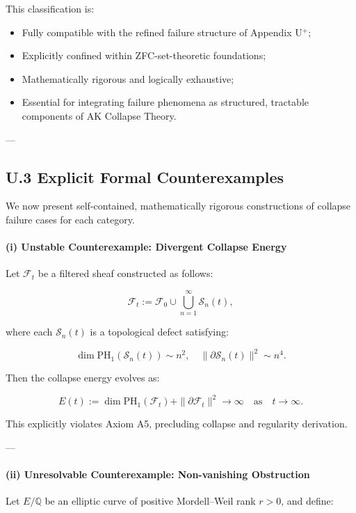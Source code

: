 \documentclass[11pt]{article}
\begin{document}
This classification is:

\begin{itemize}
    \item Fully compatible with the refined failure structure of Appendix U$^{+}$;
    \item Explicitly confined within ZFC-set-theoretic foundations;
    \item Mathematically rigorous and logically exhaustive;
    \item Essential for integrating failure phenomena as structured, tractable components of AK Collapse Theory.
\end{itemize}

---

\subsection*{U.3 Explicit Formal Counterexamples}

We now present self-contained, mathematically rigorous constructions of collapse failure cases for each category.

\paragraph{(i) Unstable Counterexample: Divergent Collapse Energy}

Let $\mathcal{F}_t$ be a filtered sheaf constructed as follows:

\[
\mathcal{F}_t := \mathcal{F}_0 \cup \bigcup_{n=1}^\infty \mathcal{S}_n(t),
\]

where each $\mathcal{S}_n(t)$ is a topological defect satisfying:

\[
\dim \mathrm{PH}_1(\mathcal{S}_n(t)) \sim n^2, \quad \|\partial \mathcal{S}_n(t)\|^2 \sim n^4.
\]

Then the collapse energy evolves as:

\[
E(t) := \dim \mathrm{PH}_1(\mathcal{F}_t) + \|\partial \mathcal{F}_t\|^2 \longrightarrow \infty \quad \text{as} \quad t \to \infty.
\]

This explicitly violates Axiom A5, precluding collapse and regularity derivation.

---

\paragraph{(ii) Unresolvable Counterexample: Non-vanishing Obstruction}

Let $E/\mathbb{Q}$ be an elliptic curve of positive Mordell–Weil rank $r>0$, and define:
\end{document}
